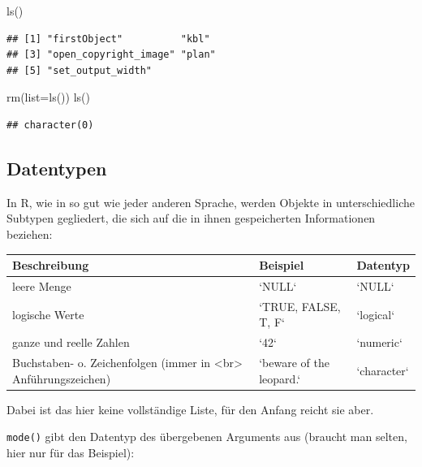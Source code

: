 \documentclass[
]{book}
\newenvironment{Shaded}{\begin{snugshade}}{\end{snugshade}}
\newcommand{\AttributeTok}[1]{\textcolor[rgb]{0.77,0.63,0.00}{#1}}
\newcommand{\FunctionTok}[1]{\textcolor[rgb]{0.00,0.00,0.00}{#1}}
\newcommand{\NormalTok}[1]{#1}
\begin{document}
\begin{Shaded}
\begin{Highlighting}[]
\FunctionTok{ls}\NormalTok{()}
\end{Highlighting}
\end{Shaded}

\begin{verbatim}
## [1] "firstObject"          "kbl"                 
## [3] "open_copyright_image" "plan"                
## [5] "set_output_width"
\end{verbatim}

\begin{Shaded}
\begin{Highlighting}[]
\FunctionTok{rm}\NormalTok{(}\AttributeTok{list=}\FunctionTok{ls}\NormalTok{())}
\FunctionTok{ls}\NormalTok{()}
\end{Highlighting}
\end{Shaded}

\begin{verbatim}
## character(0)
\end{verbatim}

\hypertarget{datentypen}{%
\subsection*{Datentypen}\label{datentypen}}

\small

In R, wie in so gut wie jeder anderen Sprache, werden Objekte in unterschiedliche Subtypen gegliedert, die sich auf die in ihnen gespeicherten Informationen beziehen:

\begin{tabular}[t]{l|l|l}
\hline
Beschreibung & Beispiel & Datentyp\\
\hline
leere Menge & `NULL` & `NULL`\\
\hline
logische Werte & `TRUE, FALSE, T,  F` & `logical`\\
\hline
ganze und reelle Zahlen & `42` & `numeric`\\
\hline
Buchstaben- o. Zeichenfolgen (immer in <br> Anführungszeichen) & `beware of the leopard.` & `character`\\
\hline
\end{tabular}

Dabei ist das hier keine vollständige Liste, für den Anfang reicht sie aber.

\texttt{mode()} gibt den Datentyp des übergebenen Arguments aus (braucht man selten, hier nur für das Beispiel):
\end{document}
